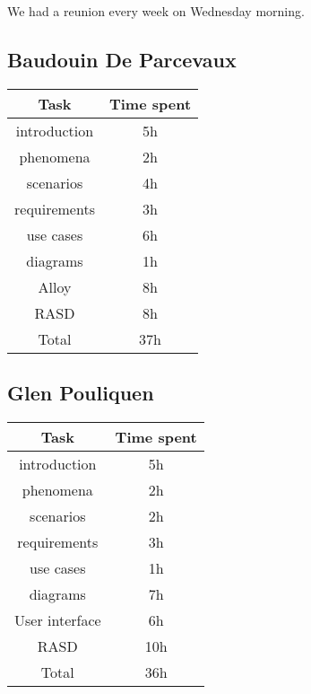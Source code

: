 We had a reunion every week on Wednesday morning. 
\subsection{Baudouin De Parcevaux}
\begin{tabular}{| c | c | }
	\hline
	\textbf{Task} & \textbf{Time spent} \\ 
	\hline\hline
	introduction & 5h \\
 	phenomena & 2h \\
	scenarios & 4h\\
 	requirements & 3h\\
	use cases & 6h\\
	diagrams & 1h\\
	Alloy & 8h\\
	RASD & 8h\\
	\hline
	Total & 37h \\
	\hline
\end{tabular}

\subsection{Glen Pouliquen}
\begin{tabular}{| c | c | }
	\hline
	\textbf{Task} & \textbf{Time spent} \\ 
	\hline\hline
	introduction & 5h \\
	phenomena & 2h\\
	scenarios & 2h\\
	requirements & 3h\\
	use cases & 1h\\
	diagrams & 7h\\
	User interface & 6h\\
	RASD & 10h\\
	\hline
	Total & 36h\\
	\hline
\end{tabular}